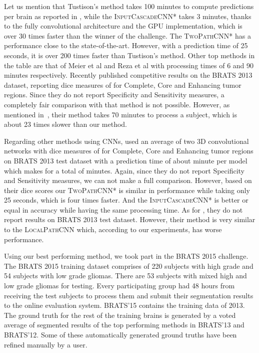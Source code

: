 \documentclass[final,5p,times,twocolumn]{elsarticle}
\begin{document}
{Let us mention that Tustison's method takes 100 minutes  to compute predictions per brain as reported in \citep{Menze2014}, while the \textsc{InputCascadeCNN*} takes 3 minutes, thanks to the fully convolutional architecture and the GPU implementation, which is over 30 times faster than the winner of the challenge. The \textsc{TwoPathCNN*}  has a performance close to the state-of-the-art. However, with a prediction time of 25 seconds, it is over 200 times faster than Tustison's method. Other top methods in the table are that of Meier et al and Reza et al with processing times of 6 and 90 minutes respectively. Recently \citet{Subbanna2014} published competitive results on the BRATS 2013 dataset, reporting dice measures of  for Complete, Core and Enhancing tumor regions. Since they do not report Specificity and Sensitivity measures, a completely fair comparison with that method is not possible. However, as mentioned in~\citep{Subbanna2014}, their method takes 70 minutes to process a subject, which is about 23 times slower than our method. 

Regarding other methods using CNNs, \citet{Urban2014} used an average of two 3D convolutional networks with dice measures of  for Complete, Core and Enhancing tumor regions on BRATS 2013 test dataset with a prediction time of about  minute per model which makes for a total of  minutes. Again, since they do not report Specificity and Sensitivity measures, we can not make a full comparison. However, based on their dice scores our \textsc{TwoPathCNN*} is similar in performance while taking only 25 seconds, which is four times faster. And the \textsc{InputCascadeCNN*} is better or equal in accuracy while having the same processing time. As for \citep{Zikic2014}, they do not report results on BRATS 2013 test dataset. However, their method is very similar to the \textsc{LocalPathCNN} which, according to our experiments, has worse performance.  

Using our best performing method, we took part in the BRATS 2015 challenge. The BRATS 2015 training dataset comprises of 220 subjects with high grade and 54 subjects with low grade gliomas. There are 53 subjects with mixed high and low grade gliomas for testing. Every participating group had 48 hours from receiving the test subjects to process them and submit their segmentation results to the online evaluation system. BRATS'15 contains the training data of 2013. The ground truth for the rest of the training brains is generated by a voted average of segmented results of the top performing methods in BRATS'13 and BRATS'12. Some of these automatically generated ground truths have been refined manually by a user. 

}
\end{document}
